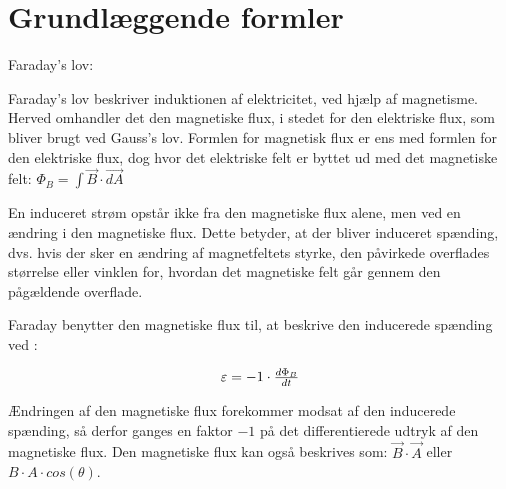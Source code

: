 \section{Grundlæggende formler}
Faraday's lov:

Faraday's lov beskriver induktionen af elektricitet, ved hjælp af magnetisme. Herved omhandler det den magnetiske flux, i stedet for den elektriske flux, som bliver brugt ved Gauss's lov. Formlen for magnetisk flux er ens med formlen for den elektriske flux, dog hvor det elektriske felt er byttet ud med det magnetiske felt: $\Phi_B = \int \vec{B} \cdot \vec{dA}$

En induceret strøm opstår ikke fra den magnetiske flux alene, men ved en ændring i den magnetiske flux. Dette betyder, at der bliver induceret spænding, dvs. hvis der sker en ændring af magnetfeltets styrke, den påvirkede overflades størrelse eller vinklen for, hvordan det magnetiske felt går gennem den pågældende overflade.

Faraday benytter den magnetiske flux til, at beskrive den inducerede spænding ved \cite{fysikbog}:

\begin{equation} \label{faraday}
\centerline{$\varepsilon = -1 \cdot \frac{d \Phi_B}{dt}$}
\end{equation}

Ændringen af den magnetiske flux forekommer modsat af den inducerede spænding, så derfor ganges en faktor $-1$ på det differentierede udtryk af den magnetiske flux. Den magnetiske flux kan også beskrives som: $\vec{B} \cdot \vec{A}$ eller $B \cdot A \cdot cos(\theta)$.
\newpage